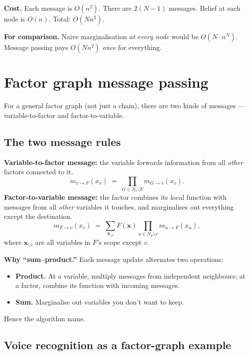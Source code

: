 \documentclass[11pt, a4paper]{article}
\begin{document}
\textbf{Cost.} Each message is $O(n^2)$. There are $2(N-1)$ messages. Belief at each node is $O(n)$. Total: $O(Nn^2)$.

\textbf{For comparison.} Naive marginalisation \emph{at every node} would be $O(N \cdot n^N)$. Message passing pays $O(Nn^2)$ \emph{once} for everything.

\section{Factor graph message passing}

For a general factor graph (not just a chain), there are two kinds of messages — variable-to-factor and factor-to-variable.

\subsection{The two message rules}

\begin{defbox}
\textbf{Variable-to-factor message:} the variable forwards information from all \emph{other} factors connected to it.
\[
m_{v\to F}(x_v) \;=\; \prod_{G\in N_v\setminus F} m_{G\to v}(x_v).
\]
\textbf{Factor-to-variable message:} the factor combines its local function with messages from all \emph{other} variables it touches, and marginalises out everything except the destination.
\[
m_{F\to v}(x_v) \;=\; \sum_{\mathbf{x}_{\setminus v}} F(\mathbf{x})\prod_{u\in N_F\setminus v} m_{u\to F}(x_u),
\]
where $\mathbf{x}_{\setminus v}$ are all variables in $F$'s scope except $v$.
\end{defbox}

\textbf{Why ``sum--product.''} Each message update alternates two operations:
\begin{itemize}
  \item \textbf{Product.} At a variable, multiply messages from independent neighbours; at a factor, combine its function with incoming messages.
  \item \textbf{Sum.} Marginalise out variables you don't want to keep.
\end{itemize}
Hence the algorithm name.

\subsection{Voice recognition as a factor-graph example}
\end{document}
